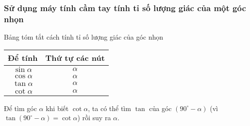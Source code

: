 \begin{tomtat}
\subsubsection{Sử dụng máy tính cầm tay tính tỉ số lượng giác của một góc nhọn}
\begin{boxdn}
	Bảng tóm tắt cách tính tỉ số lượng giác của góc nhọn
	\begin{center}
		\begin{tabular}{|c|c|}
			\hline
			Để tính & Thứ tự các nút\\
			\hline
			$\sin\alpha$ & \sink $\alpha$ \key{)}\key{=}\\
			\hline
			$\cos\alpha$ & \cosk $\alpha$ \key{)}\key{=}\\
			\hline
			$\tan\alpha$ & \tank $\alpha$ \key{)}\key{=}\\
			\hline
			$\cot\alpha$ & \key{1}\divk\tank $\alpha$ \key{)}\key{=}\\
			\hline
		\end{tabular}
	\end{center}
\end{boxdn}
\begin{note}
	Để tìm góc $\alpha$ khi biết $\cot \alpha$, ta có thể tìm $\tan$ của góc $(90^\circ -\alpha)$ (vì $\tan(90^\circ - \alpha) = \cot \alpha$) rồi suy ra $\alpha$.
\end{note}
\end{tomtat}
